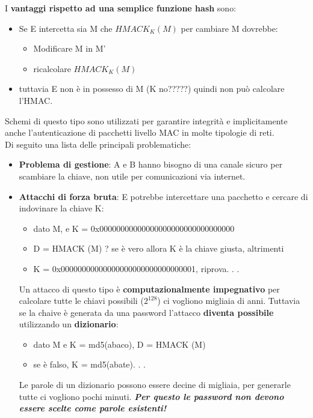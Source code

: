 \documentclass[12pt]{article}
\begin{document}
				I \textbf{vantaggi rispetto ad una semplice funzione hash} sono:
				\begin{itemize}
					\item Se E intercetta sia M che $HMACK_{K}(M)$ per cambiare M dovrebbe:
					\begin{itemize}
						\item Modificare M in M'
						\item ricalcolare $HMACK_{K}(M)$
					\end{itemize}
				\item tuttavia E non è in possesso di M (K no?????) quindi non può calcolare l'HMAC.
				\end{itemize}
				Schemi di questo tipo sono utilizzati per garantire integrità e implicitamente anche l'autenticazione di pacchetti livello MAC in molte tipologie di reti. \\
				Di seguito una lista delle principali problematiche:
				\begin{itemize}
					\item \textbf{Problema di gestione}: A e B hanno bisogno  di una canale sicuro per scambiare la chiave, non utile per comunicazioni via internet.
					\item \textbf{Attacchi di forza bruta}: E potrebbe intercettare una pacchetto e cercare di indovinare la chiave K: \begin{itemize}
						\item dato M, e K = 0x00000000000000000000000000000000
						\item D = HMACK (M) ? se è vero allora K è la chiave giusta, altrimenti
						\item K = 0x00000000000000000000000000000001, riprova. . .
					\end{itemize}
					Un attacco di questo tipo è \textbf{computazionalmente impegnativo} per calcolare tutte le chiavi possibili ($2^{128}$) ci vogliono migliaia di anni. Tuttavia se la chaive è generata da una password l'attacco \textbf{diventa possibile} utilizzando un \textbf{dizionario}:
					\begin{itemize}
						\item dato M e K = md5(abaco), D = HMACK (M)
						\item se è falso, K = md5(abate). . .
					\end{itemize}
					Le parole di un dizionario possono essere decine di migliaia, per generarle tutte ci vogliono pochi minuti.\textit{\textbf{ Per questo le password non devono essere scelte come parole esistenti!}}
				\end{itemize}
\end{document}
